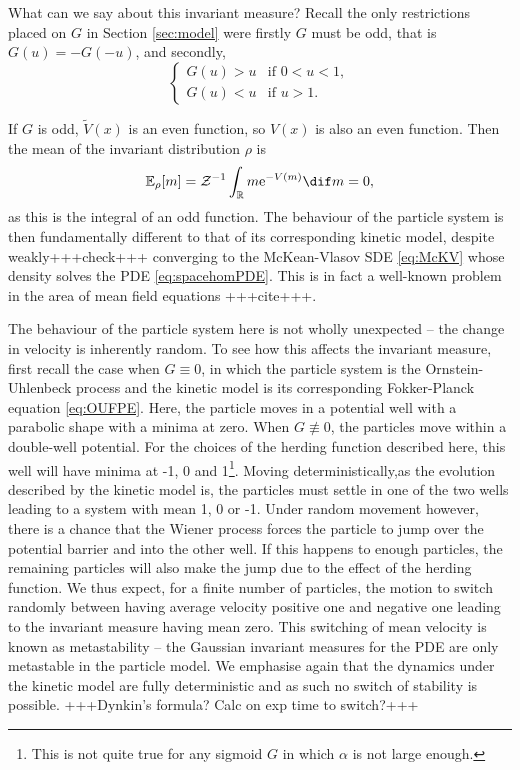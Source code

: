         What can we say about this invariant measure? Recall the only restrictions placed on $G$ in Section \ref{sec:model} were firstly $G$ must be odd, that is $G(u)=-G(-u)$, and secondly,
        \[
            \begin{cases}
            G(u)>u & \text{if } 0<u<1,\\ 
            G(u)<u &  \text{if } u>1.
            \end{cases}
        \]
         
        If $G$ is odd, $\tilde{V}(x)$ is an even function, so $V(x)$ is also an even function. Then the mean of the invariant distribution $\rho$ is
        \[
            \mathbb{E}_{\rho}[m] = \mathcal{Z}^{-1}\int_{\mathbb{R}} m \mathrm{e}^{-V(m)}\dif m = 0,
        \]
        as this is the integral of an odd function. The behaviour of the particle system is then fundamentally different to that of its corresponding kinetic model, despite weakly+++check+++ converging to the McKean-Vlasov SDE \eqref{eq:McKV} whose density solves the PDE \eqref{eq:spacehomPDE}. This is in fact a well-known problem in the area of mean field equations +++cite+++. 
        
    The behaviour of the particle system here is not wholly unexpected -- the change in velocity is inherently random. To see how this affects the invariant measure, first recall the case when $G\equiv 0$, in which the particle system is the Ornstein-Uhlenbeck process and the kinetic model is its corresponding Fokker-Planck equation \eqref{eq:OUFPE}. Here, the particle moves in a potential well with a parabolic shape with a minima at zero. When $G\not\equiv 0$, the particles move within a double-well potential. For the choices of the herding function described here, this well will have minima at -1, 0 and 1\footnote{This is not quite true for any sigmoid $G$ in which $\alpha$ is not large enough.}. Moving deterministically,as the evolution described by the kinetic model is, the particles must settle in one of the two wells leading to a system with mean 1, 0 or -1. Under random movement however, there is a chance that the Wiener process forces the particle to jump over the potential barrier and into the other well. If this happens to enough particles, the remaining particles will also make the jump due to the effect of the herding function. We thus expect, for a finite number of particles, the motion to switch randomly between having average velocity positive one and negative one leading to the invariant measure having mean zero. This switching of mean velocity is known as metastability -- the Gaussian invariant measures for the PDE are only metastable in the particle model. We emphasise again that the dynamics under the kinetic model are fully deterministic and as such no switch of stability is possible. +++Dynkin's formula? Calc on exp time to switch?+++
        
